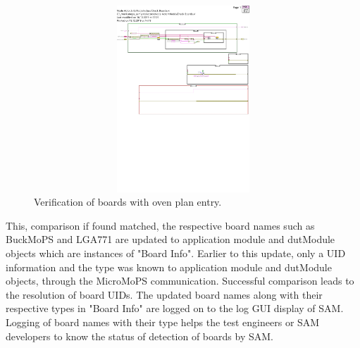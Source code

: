\begin{figure}[hbt]
		\centering
		\includegraphics[trim=0 628 0 80, clip, width=155mm, height=70mm, scale=3]{images/verify.pdf}
		\caption{Verification of boards with oven plan entry.}
		\label{fig:Verify}
\end{figure}

This, comparison if found matched, the respective board names such as BuckMoPS and LGA771 are updated to application module and dutModule objects which are instances of "Board Info". 
Earlier to this update, only a UID information and the type was known to application module and dutModule objects, through the MicroMoPS communication. 
Successful comparison leads to the resolution of board UIDs. The updated board names along with their respective types in "Board Info" are logged on to the log GUI display of SAM.
Logging of board names with their type helps the test engineers or SAM developers to know the status of detection of boards by SAM.

